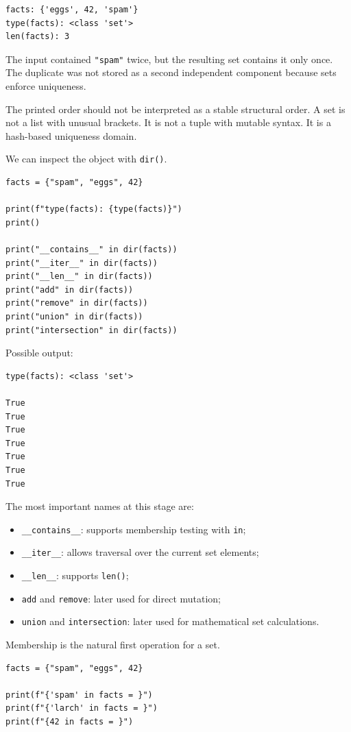 \begin{verbatim}
facts: {'eggs', 42, 'spam'}
type(facts): <class 'set'>
len(facts): 3
\end{verbatim}

The input contained \texttt{"spam"} twice, but the resulting set contains it only once. The duplicate was not stored as a second independent component because sets enforce uniqueness.

The printed order should not be interpreted as a stable structural order. A set is not a list with unusual brackets. It is not a tuple with mutable syntax. It is a hash-based uniqueness domain.

We can inspect the object with \texttt{dir()}.

\begin{verbatim}
facts = {"spam", "eggs", 42}

print(f"type(facts): {type(facts)}")
print()

print("__contains__" in dir(facts))
print("__iter__" in dir(facts))
print("__len__" in dir(facts))
print("add" in dir(facts))
print("remove" in dir(facts))
print("union" in dir(facts))
print("intersection" in dir(facts))
\end{verbatim}

Possible output:

\begin{verbatim}
type(facts): <class 'set'>

True
True
True
True
True
True
True
\end{verbatim}

The most important names at this stage are:

\begin{itemize}
    \item \texttt{\_\_contains\_\_}: supports membership testing with \texttt{in};
    \item \texttt{\_\_iter\_\_}: allows traversal over the current set elements;
    \item \texttt{\_\_len\_\_}: supports \texttt{len()};
    \item \texttt{add} and \texttt{remove}: later used for direct mutation;
    \item \texttt{union} and \texttt{intersection}: later used for mathematical set calculations.
\end{itemize}

Membership is the natural first operation for a set.

\begin{verbatim}
facts = {"spam", "eggs", 42}

print(f"{'spam' in facts = }")
print(f"{'larch' in facts = }")
print(f"{42 in facts = }")
\end{verbatim}

